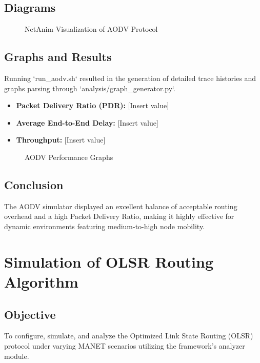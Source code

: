\documentclass[12pt,a4paper]{report}
\begin{document}
\section{Diagrams}
\begin{figure}[H]
    \centering
    \caption{NetAnim Visualization of AODV Protocol}
\end{figure}

\section{Graphs and Results}
Running `run\_aodv.sh` resulted in the generation of detailed trace histories and graphs parsing through `analysis/graph_generator.py`. 
\begin{itemize}
    \item \textbf{Packet Delivery Ratio (PDR):} [Insert value]
    \item \textbf{Average End-to-End Delay:} [Insert value]
    \item \textbf{Throughput:} [Insert value]
\end{itemize}

\begin{figure}[H]
    \centering
    \caption{AODV Performance Graphs}
\end{figure}

\section{Conclusion}
The AODV simulator displayed an excellent balance of acceptable routing overhead and a high Packet Delivery Ratio, making it highly effective for dynamic environments featuring medium-to-high node mobility.

\chapter{Simulation of OLSR Routing Algorithm}

\section{Objective}
To configure, simulate, and analyze the Optimized Link State Routing (OLSR) protocol under varying MANET scenarios utilizing the framework's analyzer module.
\end{document}
